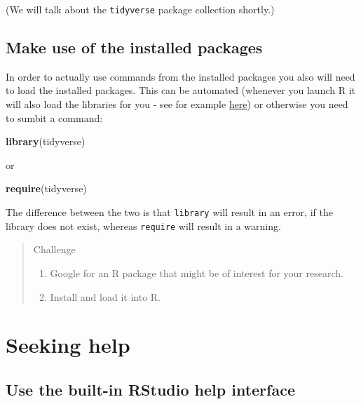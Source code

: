 \documentclass[
]{book}
\newenvironment{Shaded}{\begin{snugshade}}{\end{snugshade}}
\newcommand{\FunctionTok}[1]{\textcolor[rgb]{0.13,0.29,0.53}{\textbf{#1}}}
\newcommand{\NormalTok}[1]{#1}
\providecommand{\tightlist}{%
  \setlength{\itemsep}{0pt}\setlength{\parskip}{0pt}}
\begin{document}
(We will talk about the \texttt{tidyverse} package collection shortly.)

\hypertarget{make-use-of-the-installed-packages}{%
\subsection{Make use of the installed packages}\label{make-use-of-the-installed-packages}}

In order to actually use commands from the installed packages you also will need to load the installed packages. This can be automated (whenever you launch R it will also load the libraries for you - see for example \href{http://stackoverflow.com/a/14238658/2630957}{here}) or otherwise you need to sumbit a command:

\begin{Shaded}
\begin{Highlighting}[]
\FunctionTok{library}\NormalTok{(tidyverse)}
\end{Highlighting}
\end{Shaded}

or

\begin{Shaded}
\begin{Highlighting}[]
\FunctionTok{require}\NormalTok{(tidyverse)}
\end{Highlighting}
\end{Shaded}

The difference between the two is that \texttt{library} will result in an error, if the library does not exist, whereas \texttt{require} will result in a warning.

\begin{quote}
Challenge

\begin{enumerate}
\def\labelenumi{\arabic{enumi}.}
\tightlist
\item
  Google for an R package that might be of interest for your research.
\item
  Install and load it into R.
\end{enumerate}
\end{quote}

\hypertarget{seeking-help}{%
\section{Seeking help}\label{seeking-help}}

\hypertarget{use-the-built-in-rstudio-help-interface}{%
\subsection{Use the built-in RStudio help interface}\label{use-the-built-in-rstudio-help-interface}}
\end{document}
